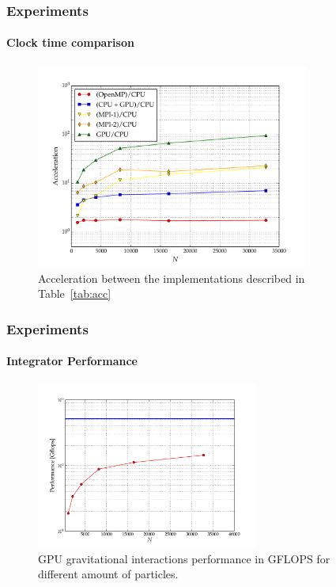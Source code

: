\begin{frame}
    \frametitle{Experiments}
    \framesubtitle{Clock time comparison}

\begin{figure}[H]
    \centering
    \label{fig:acc}
    \includegraphics[width=0.8\textwidth]{img/test_gpu-acceleration.pdf}
    \caption{Acceleration between the implementations described in Table~\ref{tab:acc}}
\end{figure}

\end{frame}
\begin{frame}
    \frametitle{Experiments}
    \framesubtitle{Integrator Performance}
\begin{figure}[H]
    \centering
    \label{fig:gflops}
    \includegraphics[width=0.65\textwidth]{img/test_gflops.pdf}
    \caption{GPU gravitational interactions performance in GFLOPS for different amount of particles.}
\end{figure}

\end{frame}
